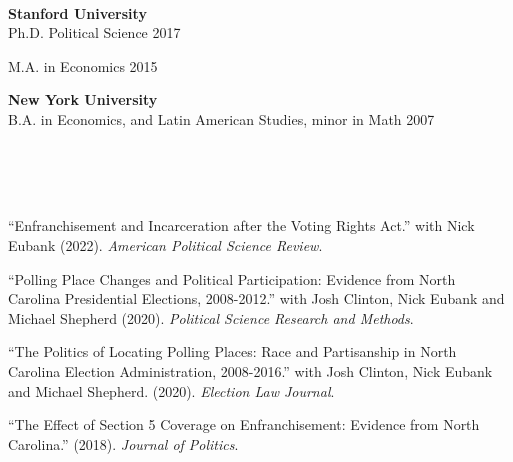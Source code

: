 \documentclass[11pt]{article}
\begin{document}

\vspace{.2in}
\begin{minipage}[t]{.21\textwidth}
	 \\
\end{minipage}
\begin{minipage}[t]{.79\textwidth}
	\textbf{Stanford University} \\
		\hspace*{.15in}Ph.D. Political Science \hfill  2017 \\
		\vspace{-.2in}

	 	\hspace*{.15in}M.A. in Economics \hfill 2015 \\
		\vspace{-.1in}

	\textbf{New York University} \\
		\hspace*{.15in}B.A. in Economics, and Latin American Studies, minor in Math \hfill  2007 \\
\end{minipage}





\vspace{.2in}
\begin{minipage}[t]{.21\textwidth}
	 \\
	 \\
	 \\
\end{minipage}
\begin{minipage}[t]{.79\textwidth}
	``Enfranchisement and Incarceration after the Voting Rights Act.'' with Nick Eubank (2022). \emph{American Political Science Review}.\\
	\vspace{-.05in}

	``Polling Place Changes and Political Participation: Evidence from North Carolina Presidential Elections, 2008-2012.'' with Josh Clinton, Nick Eubank and Michael Shepherd (2020). \emph{Political Science Research and Methods}. \\
  \vspace{-.05in}

  ``The Politics of Locating Polling Places:  Race and Partisanship in North Carolina Election Administration, 2008-2016.'' with Josh Clinton, Nick Eubank and Michael Shepherd. (2020). \emph{Election Law Journal}. \\
	\vspace{-.05in}

	``The Effect of Section 5 Coverage on Enfranchisement: Evidence from North Carolina.'' (2018).  \emph{Journal of Politics}. \\
	\vspace{-.1in}

\end{minipage}
\end{document}
